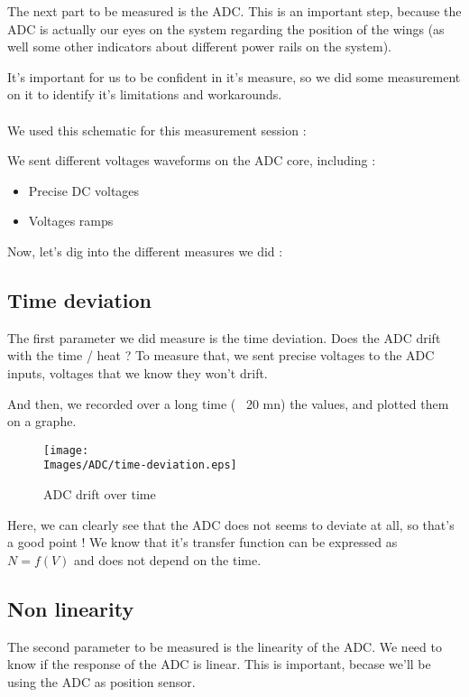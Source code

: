 The next part to be measured is the ADC. This is an important step, because the ADC is actually 
our eyes on the system regarding the position of the wings (as well some other indicators about
different power rails on the system).

It's important for us to be confident in it's measure, so we did some measurement on it to identify 
it's limitations and workarounds.

\paragraph{}
We used this schematic for this measurement session :


We sent different voltages waveforms on the ADC core, including :

\begin{itemize}
    \item Precise DC voltages
    \item Voltages ramps
\end{itemize}

Now, let's dig into the different measures we did :

\FloatBarrier
\subsection{Time deviation}
The first parameter we did measure is the time deviation. Does the ADC drift with the time / heat ?
To measure that, we sent precise voltages to the ADC inputs, voltages that we know they won't drift.

And then, we recorded over a long time (~ 20 mn) the values, and plotted them on a graphe.

\begin{figure}[!hbt]
    \centering
    \texttt{[image: \\Images/ADC/time-deviation.eps]}
    \caption{ADC drift over time}
\end{figure}
\FloatBarrier

Here, we can clearly see that the ADC does not seems to deviate at all, so that's a good point ! We 
know that it's transfer function can be expressed as $N = f(V)$ and does not depend on the time.

\FloatBarrier
\subsection{Non linearity}
The second parameter to be measured is the linearity of the ADC. We need to know if the response of 
the ADC is linear. This is important, becase we'll be using the ADC as position sensor.


